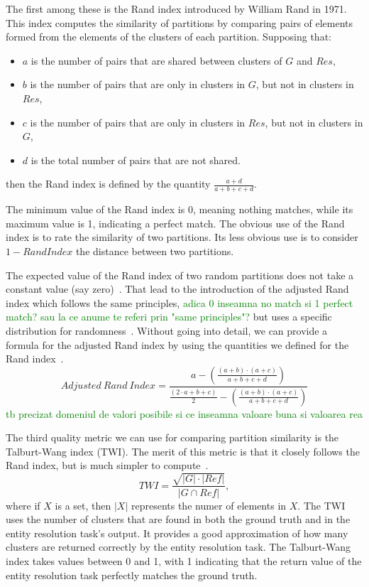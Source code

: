 The first among these is the Rand index introduced by William Rand in
1971\cite{rand1971}.
This index computes the similarity of partitions by comparing pairs of
elements formed from the elements of the clusters of each partition.
Supposing that:
\begin{itemize}
    \item $a$ is the number of pairs that are shared between clusters of $G$
    and $Res$,
    \item $b$ is the number of pairs that are only in clusters in $G$, but
    not in clusters in $Res$,
    \item $c$ is the number of pairs that are only in clusters in $Res$, but
    not in clusters in $G$,
    \item $d$ is the total number of pairs that are not shared.
\end{itemize}
then the Rand index is defined by the quantity
$\frac{a+d}{a+b+c+d}$\cite{adjrand2001}.

The minimum value of the Rand index is 0, meaning nothing matches, while its
maximum value is 1, indicating a perfect match.
The obvious use of the Rand index is to rate the similarity of two
partitions.
Its less obvious use is to consider $1 - Rand Index$ the distance between
two partitions.

The expected value of the Rand index of two random partitions does not take
a constant value (say zero)~\cite{adjrand2001}.
That lead to the introduction of the adjusted Rand index which follows the
same principles, 
\textcolor{green}{adica 0 inseamna no match si 1 perfect match? sau la ce anume te referi prin "same principles"?}
but uses a specific distribution for
randomness~\cite{adjrand1985}.
Without going into detail, we can provide a formula for the adjusted Rand
index by using the quantities we defined for the Rand index~\cite{Tal11}.
\[
    Adjusted~Rand~Index = \frac{
        a -\left(\frac{(a+b)\cdot(a+c)}{a+b+c+d}\right)
    }{
        \frac{(2\cdot a+b+c)}{2}-\left(\frac{(a+b)\cdot(a+c)}{a+b+c+d}\right)
    }
\]
\textcolor{green}{tb precizat domeniul de valori posibile si ce inseamna valoare buna si valoarea rea}

The third quality metric we can use for comparing partition similarity is
the Talburt-Wang index (TWI).
The merit of this metric is that it closely follows the Rand index, but is
much simpler to compute~\cite{Tal11}.
\[
    TWI = \frac{\sqrt{|G|\cdot|Ref|}}{|G \cap Ref|},
\]
where if $X$ is a set, then $|X|$ represents the numer of elements in $X$. 
The TWI uses the number of clusters that are found in both the ground
truth and in the entity resolution task's output.
It provides a good approximation of how many clusters are returned correctly
by the entity resolution task.
The Talburt-Wang index takes values between 0 and 1, with 1 indicating that
the return value of the entity resolution task perfectly matches the ground
truth.

